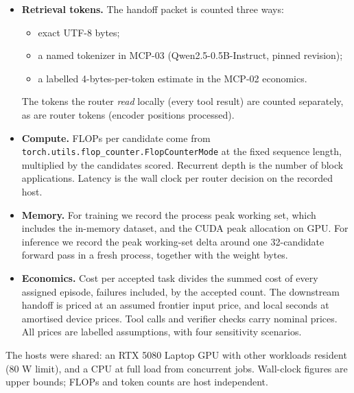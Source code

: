 \begin{itemize}
\item \textbf{Retrieval tokens.} The handoff packet is counted three ways:
\begin{itemize}
\item exact UTF-8 bytes;
\item a named tokenizer in MCP-03 (Qwen2.5-0.5B-Instruct, pinned revision);
\item a labelled 4-bytes-per-token estimate in the MCP-02 economics.
\end{itemize}
The tokens the router \emph{read} locally (every tool result) are counted separately, as are router tokens (encoder
positions processed).
\item \textbf{Compute.} FLOPs per candidate come from \texttt{torch.utils.flop\_counter.FlopCounterMode} at the fixed sequence
length, multiplied by the candidates scored. Recurrent depth is the number of block applications. Latency is the
wall clock per router decision on the recorded host.
\item \textbf{Memory.} For training we record the process peak working set, which includes the in-memory dataset, and the CUDA
peak allocation on GPU. For inference we record the peak working-set delta around one 32-candidate forward pass in a
fresh process, together with the weight bytes.
\item \textbf{Economics.} Cost per accepted task divides the summed cost of every assigned episode, failures included, by
the accepted count. The downstream handoff is priced at an assumed frontier input price, and local seconds at
amortised device prices. Tool calls and verifier checks carry nominal prices. All prices are labelled assumptions,
with four sensitivity scenarios.
\end{itemize}
The hosts were shared: an RTX 5080 Laptop GPU with other workloads resident (80 W limit), and a CPU at
full load from concurrent jobs. Wall-clock figures are upper bounds; FLOPs and token counts are host independent.
